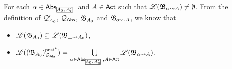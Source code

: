 
For each $\alpha\in\abs_{\mhcancel{A_0,A_0'}}$ and $A\in{\sf Act}$ such that ${\mathscr{L} }({\mathfrak{B} }_{\alpha\rightsquigarrow A})\neq \emptyset$.
From the definition of ${\mathcal{Q} }'_{A_0}$, ${\mathcal{Q} }_{{\mathsf{Abs} }}$, ${\mathfrak{B} }_{A_0}$ and ${\mathfrak{B} }_{\alpha\rightsquigarrow A}$, we know that
\begin{itemize}
    \item ${\mathscr{L} }({\mathfrak{B} }_{A_0})\subseteq{\mathscr{L} }({\mathfrak{B} }_{\bot\rightsquigarrow A_0})$,
    \item $\Lang((\AutB_{A_0})^{\post^*}_{\Qq_{\abs}}) = \bigcup\limits_{\alpha\in\abs_{\mhcancel{A_0,A_0'}}, A\in\act}\Lang(\AutB_{\alpha\rightsquigarrow A})$.
\end{itemize}

